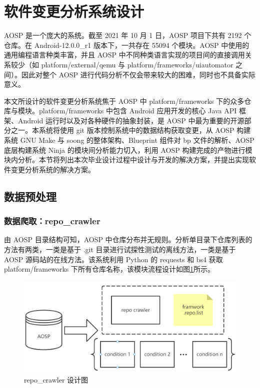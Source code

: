 \section{软件变更分析系统设计}\label{system-design}

AOSP 是一个庞大的系统。截至 2021 年 10 月 1 日，AOSP 项目下共有 2192 个仓库。在 Android-12.0.0\_r1 版本下，一共存在 55094 个模块。AOSP 中使用的通用编程语言种类丰富，并且 AOSP 中不同种类语言实现的项目间的直接调用关系较少（如 platform/external/qemu 与 platform/frameworks/uiautomator 之间）。因此对整个 AOSP 进行代码分析不仅会带来较大的困难，同时也不具备实际意义。

本文所设计的软件变更分析系统焦于 AOSP 中 platform/frameworks 下的众多仓库与模块。platform/frameworks 中包含 Android 应用开发的核心 Java API 框架、Android 运行时以及对各种硬件的抽象封装，是 AOSP 中最为重要的开源部分之一。本系统将使用 git 版本控制系统中的数据结构获取变更，从 AOSP 构建系统 GNU Make 与 soong 的整体架构、Blueprint 组件对 bp 文件的解析、AOSP 底层构建系统 Ninja 的模块间分析能力切入，利用 AOSP 构建完成的产物进行模块内分析。本节将列出本次毕业设计过程中设计与开发的解决方案，并提出实现软件变更分析系统的解决方案。

\subsection{数据预处理}

\subsubsection{数据爬取：repo\_crawler}

由 AOSP 目录结构可知，AOSP 中仓库分布并无规则。分析单目录下仓库列表的方法有两类，一类是基于 .git 目录进行试探性测试的离线方法，一类是基于 AOSP 源码站的在线方法。该系统利用 Python 的 requests 和 bs4 获取 platform/frameworks 下所有仓库名称，该模块流程设计如图\ref{fig:archi-repo-crawler}所示。

\begin{figure}[htb]
    \centering
    \includegraphics[width=.9\textwidth]{figures/archi-repo-crawler.png}
    \caption{repo\_crawler 设计图}
    \label{fig:archi-repo-crawler}
\end{figure}

